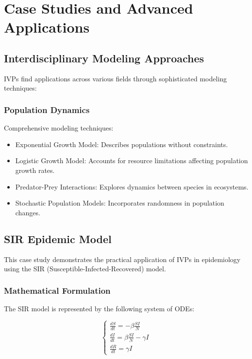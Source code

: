 \documentclass[12pt,a4paper]{article}
\begin{document}
\section{Case Studies and Advanced Applications}

\subsection{Interdisciplinary Modeling Approaches}
IVPs find applications across various fields through sophisticated modeling techniques: 

\subsubsection{Population Dynamics}
Comprehensive modeling techniques:
\begin{itemize}
    \item Exponential Growth Model: Describes populations without constraints.
    \item Logistic Growth Model: Accounts for resource limitations affecting population growth rates.
    \item Predator-Prey Interactions: Explores dynamics between species in ecosystems.
    \item Stochastic Population Models: Incorporates randomness in population changes. 
\end{itemize}

\subsection{SIR Epidemic Model}
This case study demonstrates the practical application of IVPs in epidemiology using the SIR (Susceptible-Infected-Recovered) model.

\subsubsection{Mathematical Formulation}
The SIR model is represented by the following system of ODEs:

\begin{equation}
\begin{cases}
\frac{dS}{dt} = -\beta \frac{SI}{N} \\
\frac{dI}{dt} = \beta \frac{SI}{N} - \gamma I \\
\frac{dR}{dt} = \gamma I
\end{cases}
\end{equation}
\end{document}
